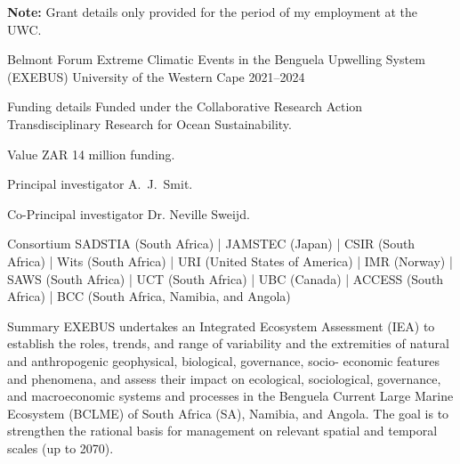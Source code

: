 


\textbf{Note:} Grant details only provided for the period of my employment at the UWC.

\begin{cventries}


\cventry
{Belmont Forum} %
{Extreme Climatic Events in the Benguela Upwelling System (EXEBUS)} %
{University of the Western Cape} %
{2021--2024} %
{ %
\begin{cvdescription}
    \item[Funding details] {Funded under the Collaborative Research Action Transdisciplinary Research for Ocean Sustainability.}
    \item[Value] {ZAR 14 million funding.}
    \item[Principal investigator] A.~J.~Smit.
    \item[Co-Principal investigator] Dr. Neville Sweijd.
    \item[Consortium] SADSTIA (South Africa) | JAMSTEC (Japan) | CSIR (South Africa) | Wits (South Africa) | URI (United States of America) | IMR (Norway) | SAWS (South Africa) | UCT (South Africa) | UBC (Canada) | ACCESS (South Africa) | BCC (South Africa, Namibia, and Angola)
    \item[Summary] {
        EXEBUS undertakes an Integrated Ecosystem Assessment (IEA) to establish the roles, trends, and range of variability and the extremities of natural and anthropogenic geophysical, biological, governance, socio- economic features and phenomena, and assess their impact on ecological, sociological, governance, and macroeconomic systems and processes in the Benguela Current Large Marine Ecosystem (BCLME) of South Africa (SA), Namibia, and Angola. The goal is to strengthen the rational basis for management on relevant spatial and temporal scales (up to 2070).}
\end{cvdescription}
}


\end{cventries}

